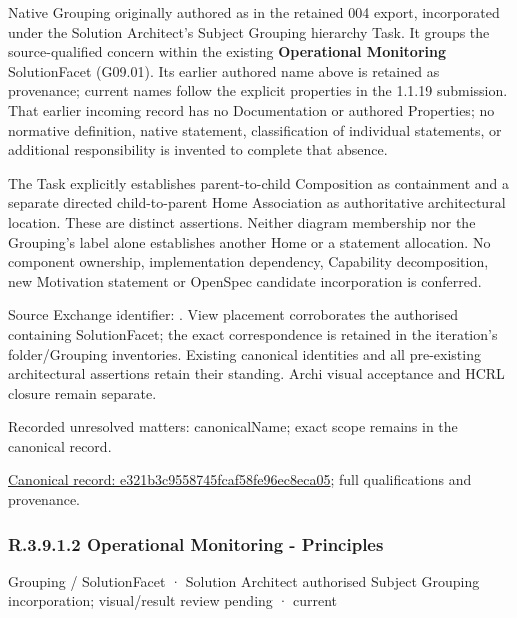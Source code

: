 Native Grouping originally authored as \texttt{} in the retained 004 export,
incorporated under the Solution Architect's Subject Grouping hierarchy Task.
It groups the source-qualified \texttt{} concern within
the existing \textbf{Operational Monitoring} SolutionFacet (G09.01). Its earlier authored name above is retained as provenance; current names
follow the explicit properties in the 1.1.19 submission.
That earlier incoming record has no Documentation or authored Properties; no normative
definition, native statement, classification of individual statements, or
additional responsibility is invented to complete that absence.



The Task explicitly establishes parent-to-child Composition as containment and
a separate directed child-to-parent Home Association as authoritative architectural
location. These are distinct assertions. Neither diagram membership nor the
Grouping's label alone establishes another Home or a statement allocation.
No component ownership, implementation dependency, Capability decomposition,
new Motivation statement or OpenSpec candidate incorporation is conferred.



Source Exchange identifier: \texttt{}. View placement corroborates
the authorised containing SolutionFacet; the exact correspondence is retained in the
iteration's folder/Grouping inventories. Existing canonical identities and all
pre-existing architectural assertions retain their standing. Archi visual
acceptance and HCRL closure remain separate.


{\small Recorded unresolved matters: canonicalName; exact scope remains in the canonical record.}\par
{\footnotesize \href{../../../../../../../continuum/grouping/e321b3c9558745fcaf58fe96ec8eca05.md}{Canonical record: e321b3c9558745fcaf58fe96ec8eca05}; full qualifications and provenance.}\par
\subsubsection*{R.3.9.1.2 Operational Monitoring - Principles}
\label{navigation:R.3.9.1.2}

\label{element:73a9255ce3cd4be89c2f5f65868c5f79}
{\small Grouping / SolutionFacet · Solution Architect authorised Subject Grouping incorporation; visual/result review pending · current}\par

